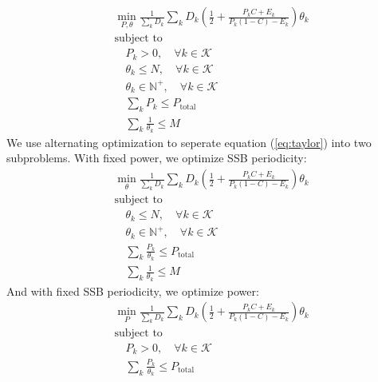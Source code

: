 \begin{subequations} \label{eq:taylor}
    \begin{align}
        &\min_{P, \theta} \frac{1}{\sum_k D_k}\sum_k D_k \left( \frac{1}{2} + \frac{P_k C + E_k}{P_k (1-C) - E_k} \right) \theta_k \\
        &\text{subject to} \\
        &\quad P_k > 0, \quad \forall k \in \mathcal{K} \\
        &\quad \theta_k \leq N, \quad \forall k \in \mathcal{K} \\
        &\quad \theta_k \in \mathbb{N}^+, \quad \forall k \in \mathcal{K} \\
        &\quad \sum_k P_k \leq P_{\text{total}} \\
        &\quad \sum_k \frac{1}{\theta_k} \leq M
    \end{align}
\end{subequations}
We use alternating optimization to seperate equation (\ref{eq:taylor}) into two subproblems. With fixed power, we optimize SSB periodicity:
\begin{subequations} \label{taylor_theta}
    \begin{align}
        &\min_{\theta} \frac{1}{\sum_k D_k}\sum_k D_k \left( \frac{1}{2} + \frac{P_k C + E_k}{P_k(1-C) - E_k} \right) \theta_k \\
        &\text{subject to} \\
        &\quad \theta_k \leq N, \quad \forall k \in \mathcal{K} \\
        &\quad \theta_k \in \mathbb{N}^+, \quad \forall k \in \mathcal{K} \\
        &\quad \sum_k \frac{P_k}{\theta_k} \leq P_{\text{total}} \\
        &\quad \sum_k \frac{1}{\theta_k} \leq M
    \end{align}
\end{subequations}
And with fixed SSB periodicity, we optimize power:
\begin{subequations} \label{taylor_power}
    \begin{align}
        &\min_{P} \frac{1}{\sum_k D_k}\sum_k D_k \left( \frac{1}{2} + \frac{P_k C + E_k}{P_k(1-C) - E_k} \right) \theta_k \\
        &\text{subject to} \\
        &\quad P_k > 0, \quad \forall k \in \mathcal{K} \\
        &\quad \sum_k \frac{P_k}{\theta_k} \leq P_{\text{total}}
    \end{align}
\end{subequations}

